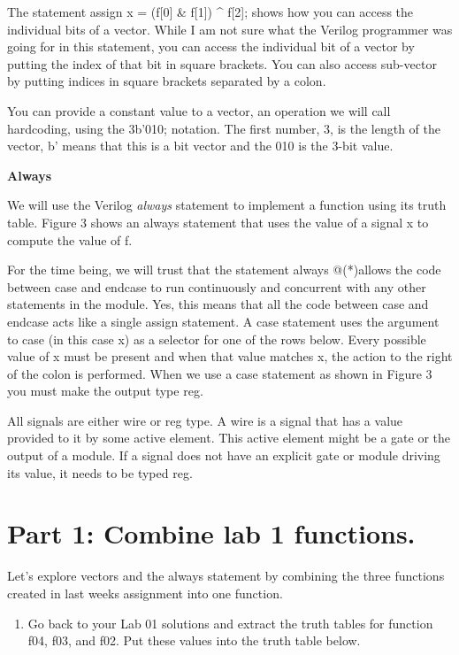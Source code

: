 The statement assign x = (f{[}0{]} \& f{[}1{]}) \^{} f{[}2{]}; shows how
you can access the individual bits of a vector. While I am not sure what
the Verilog programmer was going for in this statement, you can access
the individual bit of a vector by putting the index of that bit in
square brackets. You can also access sub-vector by putting indices in
square brackets separated by a colon.

You can provide a constant value to a vector, an operation we will call
hardcoding, using the 3b'010; notation. The first number, 3, is the
length of the vector, b' means that this is a bit vector and the 010 is
the 3-bit value.

\textbf{Always}

We will use the Verilog \emph{always} statement to implement a function
using its truth table. Figure 3 shows an always statement that uses the
value of a signal x to compute the value of f.

For the time being, we will trust that the statement always @(*)allows
the code between case and endcase to run continuously and concurrent
with any other statements in the module. Yes, this means that all the
code between case and endcase acts like a single assign statement. A
case statement uses the argument to case (in this case x) as a selector
for one of the rows below. Every possible value of x must be present and
when that value matches x, the action to the right of the colon is
performed. When we use a case statement as shown in Figure 3 you must
make the output type reg.

All signals are either wire or reg type. A wire is a signal that has a
value provided to it by some active element. This active element might
be a gate or the output of a module. If a signal does not have an
explicit gate or module driving its value, it needs to be typed reg.

\hypertarget{part-1-combine-lab-1-functions.}{%
\section{Part 1: Combine lab 1
functions.}\label{part-1-combine-lab-1-functions.}}

Let's explore vectors and the always statement by combining the three
functions created in last weeks assignment into one function.

\begin{enumerate}
\def\labelenumi{\arabic{enumi}.}
\item
  Go back to your Lab 01 solutions and extract the truth tables for
  function f04, f03, and f02. Put these values into the truth table
  below.
\end{enumerate}

